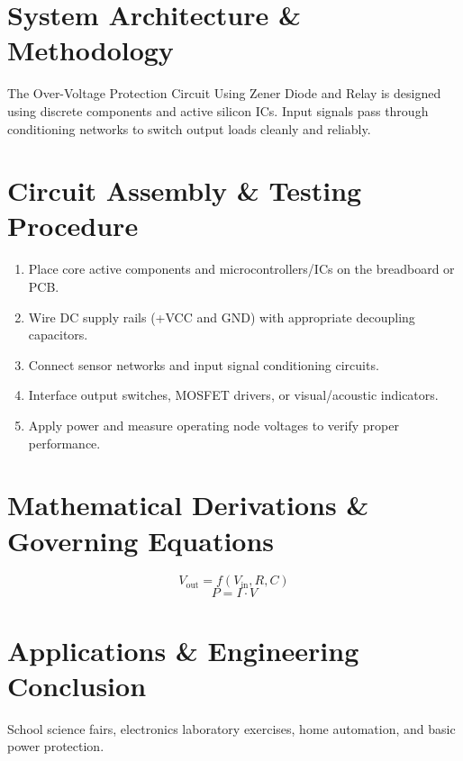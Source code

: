 \documentclass[11pt,a4paper]{article}
\begin{document}
\section{System Architecture \& Methodology}
The Over-Voltage Protection Circuit Using Zener Diode and Relay is designed using discrete components and active silicon ICs. Input signals pass through conditioning networks to switch output loads cleanly and reliably.

\section{Circuit Assembly \& Testing Procedure}
\begin{enumerate}
    \item Place core active components and microcontrollers/ICs on the breadboard or PCB.
    \item Wire DC supply rails (+VCC and GND) with appropriate decoupling capacitors.
    \item Connect sensor networks and input signal conditioning circuits.
    \item Interface output switches, MOSFET drivers, or visual/acoustic indicators.
    \item Apply power and measure operating node voltages to verify proper performance.
\end{enumerate}

\section{Mathematical Derivations \& Governing Equations}
\begin{equation}
V_{\text{out}} = f(V_{\text{in}}, R, C)
\end{equation}
\begin{equation}
P = I \cdot V
\end{equation}

\section{Applications \& Engineering Conclusion}
School science fairs, electronics laboratory exercises, home automation, and basic power protection.
\end{document}
